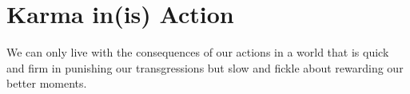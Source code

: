 \section{Karma in(is) Action}

We can only live with the consequences of our actions in a world that is quick and firm in punishing our transgressions but slow and fickle about rewarding our better moments.



